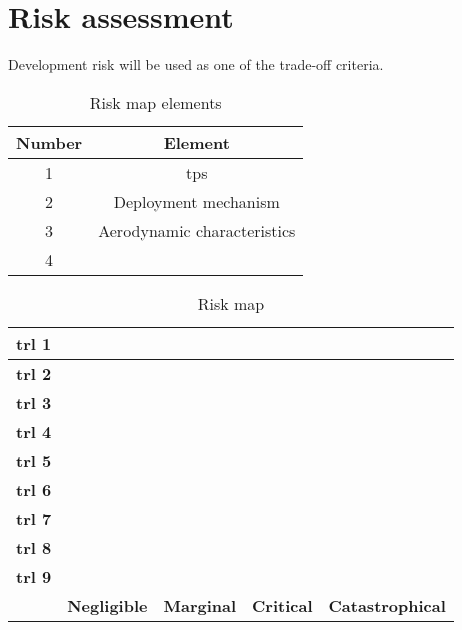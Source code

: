 \section{Risk assessment}
\label{ch:riskestimation}
Development risk will be used as one of the trade-off criteria. 

\begin{table}[h]
	\centering
	\caption{Risk map elements}
	\label{tab:riskmapelements}
	\begin{tabular}{|c|c|}
		\hline 
		\textbf{Number} & \textbf{Element} \\ \hline \hline
		1 & \acrlong{tps} \\
		2 & Deployment mechanism \\
		3 & Aerodynamic characteristics \\
		4 & \\
		\hline
	\end{tabular}
\end{table}

\begin{table}[H]
	\caption{Risk map}
	\label{tab:riskmap}
	\begin{tabular}{|c|c|c|c|c|} %
		\hline
		\textbf{\gls{trl} 1} & \cellcolor{green} & \cellcolor{yellow} & \cellcolor{red} & \cellcolor{red} \\ \hline
		\textbf{\gls{trl} 2} & \cellcolor{green} & \cellcolor{yellow} & \cellcolor{red} & \cellcolor{red} \\ \hline
		\textbf{\gls{trl} 3} & \cellcolor{green} & \cellcolor{yellow} & \cellcolor{red} & \cellcolor{red} \\ \hline
		\textbf{\gls{trl} 4} & \cellcolor{green} & \cellcolor{yellow} & \cellcolor{yellow} & \cellcolor{yellow} \\ \hline
		\textbf{\gls{trl} 5} & \cellcolor{green} & \cellcolor{green} & \cellcolor{yellow} & \cellcolor{yellow} \\ \hline
		\textbf{\gls{trl} 6} & \cellcolor{green} & \cellcolor{green} & \cellcolor{green} & \cellcolor{green} \\ \hline
		\textbf{\gls{trl} 7} & \cellcolor{green} & \cellcolor{green} & \cellcolor{green} & \cellcolor{green} \\ \hline
		\textbf{\gls{trl} 8} & \cellcolor{green} & \cellcolor{green} & \cellcolor{green} & \cellcolor{green} \\ \hline
		\textbf{\gls{trl} 9} & \cellcolor{green} & \cellcolor{green} & \cellcolor{green} & \cellcolor{green} \\ \hline
		 & \textbf{Negligible} & \textbf{Marginal} & \textbf{Critical} & \textbf{Catastrophical} \\ \hline
	\end{tabular}
\end{table}

